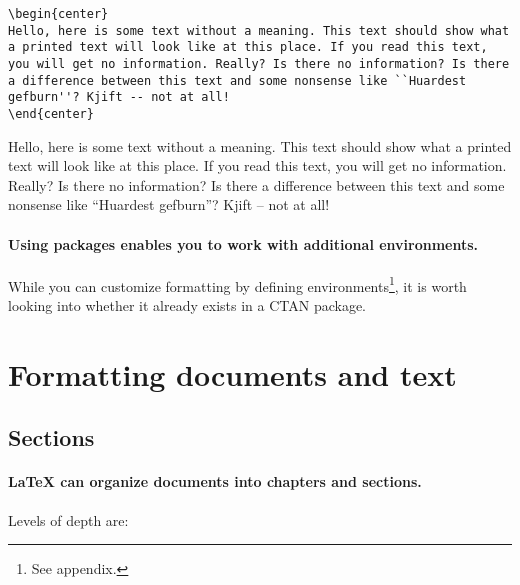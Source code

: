 \documentclass[11pt]{article}
\begin{document}
\begin{lstlisting}
\begin{center}
Hello, here is some text without a meaning. This text should show what a printed text will look like at this place. If you read this text, you will get no information. Really? Is there no information? Is there a difference between this text and some nonsense like ``Huardest gefburn''? Kjift -- not at all!
\end{center}
\end{lstlisting}

\begin{center}
Hello, here is some text without a meaning. This text should show what a printed text will look like at this place. If you read this text, you will get no information. Really? Is there no information? Is there a difference between this text and some nonsense like ``Huardest gefburn''? Kjift -- not at all!
\end{center}

\paragraph{Using packages enables you to work with additional environments.} While you can customize formatting by defining environments\footnote{See appendix.}, it is worth looking into whether it already exists in a CTAN package.


\section*{Formatting documents and text}

\subsection*{Sections}

\paragraph{{\LaTeX} can organize documents into chapters and sections.} Levels of depth are:
\end{document}
